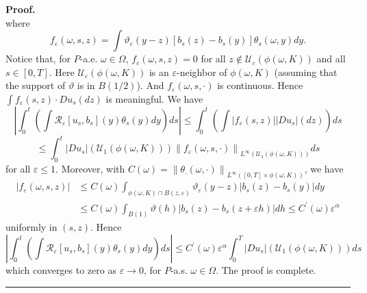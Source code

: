 \documentclass[a4paper,11pt]{article}
\newenvironment{proof}[1][Proof]{\textbf{#1.} }{\ \rule{0.5em}{0.5em}}
\begin{document}
\begin{proof}
\begin{equation*}
\end{equation*}
where
\begin{equation*}
f_{\varepsilon }\left( \omega ,s,z\right) =\int \vartheta _{\varepsilon
}\left( y-z\right) \left[ b_{s}\left( z\right) -b_{s}\left( y\right) \right]
\theta _{s}\left( \omega ,y\right) dy.
\end{equation*}
Notice that, for $P$-a.e. $\omega \in \Omega $, $f_{\varepsilon }\left(
\omega ,s,z\right) =0$ for all $z\notin \mathcal{U}_{\varepsilon }\left(
\phi \left( \omega ,K\right) \right) $ and all $s\in \left[ 0,T\right] $.
Here $\mathcal{U}_{\varepsilon }\left( \phi \left( \omega ,K\right) \right) $
is an $\varepsilon $-neighbor of $\phi \left( \omega ,K\right) $ (assuming
that the support of $\vartheta $ is in $B\left( 1/2\right) $). And $%
f_{\varepsilon }\left( \omega ,s,\cdot \right) $ is continuous. Hence $\int
f_{\varepsilon }\left( s,z\right) \cdot Du_{s}\left( dz\right) $ is
meaningful. We have
\begin{equation*}
\left| \int_{0}^{t}\left( \int \mathcal{R}_{\varepsilon }\left[ u_{s},b_{s}%
\right] \left( y\right) \theta _{s}\left( y\right) dy\right) ds\right| \leq
\int_{0}^{t}\left( \int \left| f_{\varepsilon }\left( s,z\right) \right|
\left| Du_{s}\right| \left( dz\right) \right) ds
\end{equation*}
\begin{equation*}
\leq \int_{0}^{t}\left| Du_{s}\right| \left( \mathcal{U}_{1}\left( \phi
\left( \omega ,K\right) \right) \right) \left\| f_{\varepsilon }\left(
\omega ,s,\cdot \right) \right\| _{L^{\infty }\left( \mathcal{U}_{1}\left(
\phi \left( \omega ,K\right) \right) \right) }ds
\end{equation*}
for all $\varepsilon \leq 1$. Moreover, with $C\left( \omega \right)
=\left\| \theta _{\cdot }\left( \omega ,\cdot \right) \right\| _{L^{\infty
}\left( \left[ 0,T\right] \times \phi \left( \omega ,K\right) \right) }$, we
have
\begin{align*}
\left| f_{\varepsilon }\left( \omega ,s,z\right) \right| & \leq C\left(
\omega \right) \int_{\phi \left( \omega ,K\right) \cap B\left( z,\varepsilon
\right) }\vartheta _{\varepsilon }\left( y-z\right) \left| b_{s}\left(
z\right) -b_{s}\left( y\right) \right| dy \\
& \leq C\left( \omega \right) \int_{B\left( 1\right) }\vartheta \left(
h\right) \left| b_{s}\left( z\right) -b_{s}\left( z+\varepsilon h\right)
\right| dh\leq C^{\prime }\left( \omega \right) \varepsilon ^{\alpha }
\end{align*}
uniformly in $\left( s,z\right) $. Hence
\begin{equation*}
\left| \int_{0}^{t}\left( \int \mathcal{R}_{\varepsilon }\left[ u_{s},b_{s}%
\right] \left( y\right) \theta _{s}\left( y\right) dy\right) ds\right| \leq
C^{\prime }\left( \omega \right) \varepsilon ^{\alpha }\int_{0}^{T}\left|
Du_{s}\right| \left( \mathcal{U}_{1}\left( \phi \left( \omega ,K\right)
\right) \right) ds
\end{equation*}
which converges to zero as $\varepsilon \rightarrow 0$, for $P$-a.s. $\omega
\in \Omega $. The proof is complete.
\end{proof}
\end{document}
